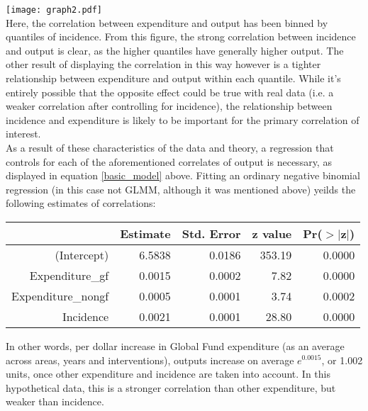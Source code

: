 \documentclass[twocolumn]{bmcart}%
\begin{document}
\hspace*{-.3in}
\texttt{[image: graph2.pdf]} \\

Here, the correlation between expenditure and output has been binned by quantiles of incidence. From this figure, the strong correlation between incidence and output is clear, as the higher quantiles have generally higher output. The other result of displaying the correlation in this way however is a tighter relationship between expenditure and output within each quantile. While it's entirely possible that the opposite effect could be true with real data (i.e. a weaker correlation after controlling for incidence), the relationship between incidence and expenditure is likely to be important for the primary correlation of interest. \\

As a result of these characteristics of the data and theory, a regression that controls for each of the aforementioned correlates of output is necessary, as displayed in equation \ref{basic_model} above. Fitting an ordinary negative binomial regression (in this case not GLMM, although it was mentioned above) yeilds the following estimates of correlations:

\begin{table}[ht]
\centering
\begin{tabular}{rrrrr}
  \hline
 & Estimate & Std. Error & z value & Pr($>$$|$z$|$) \\
  \hline
(Intercept) & 6.5838 & 0.0186 & 353.19 & 0.0000 \\
  Expenditure\_gf & 0.0015 & 0.0002 & 7.82 & 0.0000 \\
  Expenditure\_nongf & 0.0005 & 0.0001 & 3.74 & 0.0002 \\
  Incidence & 0.0021 & 0.0001 & 28.80 & 0.0000 \\
   \hline
\end{tabular}
\end{table}

In other words, per dollar increase in Global Fund expenditure (as an average across areas, years and interventions), outputs increase on average $e^{0.0015}$, or 1.002 units, once other expenditure and incidence are taken into account. In this hypothetical data, this is a stronger correlation than other expenditure, but weaker than incidence.

\clearpage


% 
\end{document}
